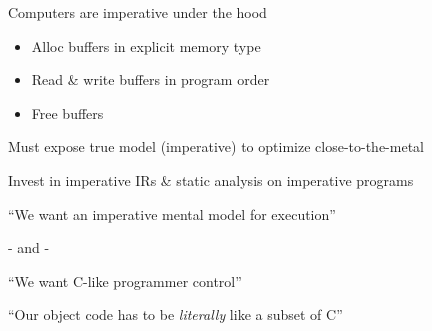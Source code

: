 \newpage
{}

{\LARGE

Computers are imperative under the hood
\begin{itemize}
  \item Alloc buffers in explicit memory type
  \item Read \& write buffers in program order
  \item Free buffers
\end{itemize}

\vfill


Must expose true model (imperative) to optimize close-to-the-metal

\vfill


Invest in imperative IRs \& static analysis on imperative programs

\vfill

\hphantom{SPACER}

}

\newpage
{}

{\LARGE

``We want an imperative mental model for execution''

\begin{centering}

- and -

\end{centering}

``We want C-like programmer control''

\begin{centering}


\end{centering}

``Our object code has to be \emph{literally} like a subset of C''

}

\newpage
{}

